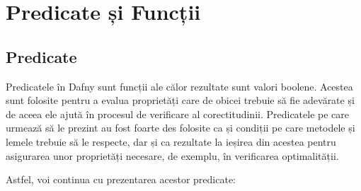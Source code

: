 \section{Predicate și Funcții}

\subsection{Predicate}

Predicatele în Dafny sunt funcții ale călor rezultate sunt valori boolene. Acestea sunt folosite pentru a evalua proprietăți care de obicei trebuie să fie adevărate și de aceea ele ajută în procesul de verificare al corectitudinii. Predicatele pe care urmează să le prezint au fost foarte des folosite ca și condiții pe care metodele și lemele trebuie să le respecte, dar și ca rezultate la ieșirea din acestea pentru asigurarea unor proprietăți necesare, de exemplu, în verificarea optimalității. \par
Astfel, voi continua cu prezentarea acestor predicate:

